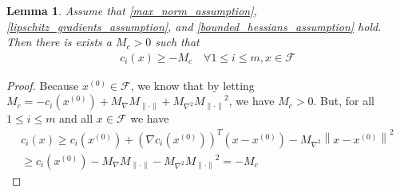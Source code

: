 \documentclass{article}
\newtheorem{lemma}[theorem]{Lemma}
\theoremstyle{case}
\newcommand{\maxgrad}{{M_{\nabla}}}
\newcommand{\maxhessian}{{M_{\nabla^2}}}
\newcommand{\feasible}{{\mathcal F}}
\newcommand{\maxnorm}{{M_{\|\cdot\|}}}
\begin{document}
\begin{lemma}
\label{maximum_constraint_value_lemma}
Assume that \cref{max_norm_assumption}, \cref{lipschitz_gradients_assumption}, and \cref{bounded_hessians_assumption} hold.
Then there is exists a $M_c>0$ such that
\begin{align*}
c_i(x) \ge -M_c \quad \forall 1\le i \le m, x \in \feasible
\end{align*}
\end{lemma}
\begin{proof}
Because $x^{(0)} \in\feasible$, we know that
by letting $M_c = -c_i(x^{(0)}) + \maxgrad\maxnorm + \maxhessian \maxnorm^2$, we have $M_c > 0$.
But, for all $1 \le i \le m$ and all $x \in \feasible$ we have
\begin{align*}
c_i(x) \ge c_i(x^{(0)}) + \left(\nabla c_i(x^{(0)})\right)^T\left(x - x^{(0)}\right) - \maxhessian \left\|x - x^{(0)}\right\|^2 \\
\ge c_i(x^{(0)}) - \maxgrad\maxnorm - \maxhessian \maxnorm^2 = -M_c
\end{align*}
\end{proof}
\end{document}
